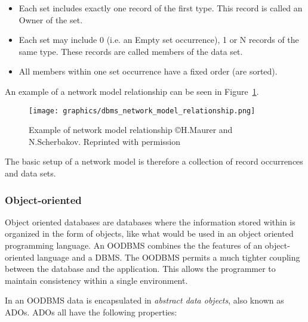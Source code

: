 \documentclass[letterpaper, 12pt]{article}
\begin{document}
\begin{itemize}
  \item Each set includes exactly one record of the first type. This record is called an Owner of the set.
  \item Each set may include 0 (i.e. an Empty set occurrence), 1 or N records of the same type. These records are called members of the data set.
  \item All members within one set occurrence have a fixed order (are sorted).
\end{itemize}
An example of a network model relationship can be seen in Figure~\ref{fig:networkDBMS_relationship}.
\par\vspace{\baselineskip}
\begin{figure}
  \centering
  \label{fig:networkDBMS_relationship}
  \texttt{[image: graphics/dbms\_network\_model\_relationship.png]}
  \caption{Example of network model relationship \copyright H.Maurer and N.Scherbakov. Reprinted with permission \cite{network_model_coronet}}
\end{figure}

The basic setup of a network model is therefore a collection of record occurrences and
data sets.

\subsubsection{Object-oriented}
Object oriented databases are databases where the information stored within is organized
in the form of objects, like what would be used in an object oriented programming
language. An OODBMS combines the the features of an object-oriented language and a
DBMS. The OODBMS permits a much tighter coupling between the database and the application. This allows the programmer to maintain consistency within a single environment.
\par\vspace{\baselineskip}
In an OODBMS data is encapsulated in \textit{abstract data objects}, also known
as ADOs. ADOs all have the following properties:
\end{document}
